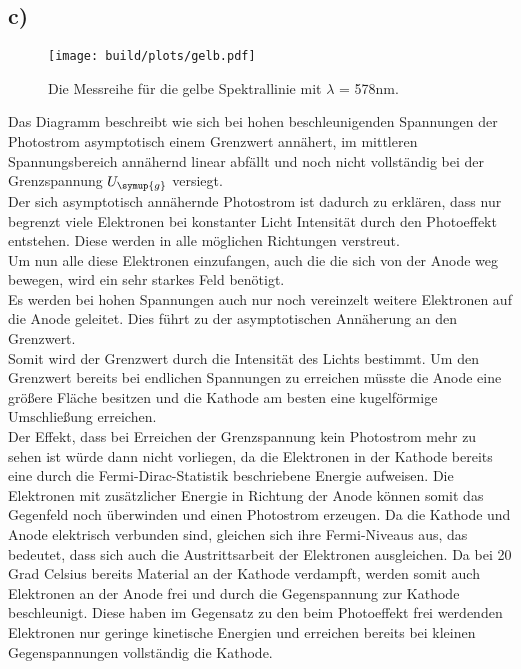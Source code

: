     \subsection{c)}

    \begin{figure}[H]
        \centering
        \texttt{[image: build/plots/gelb.pdf]}
        \caption{Die Messreihe für die gelbe Spektrallinie mit $\lambda$ = 578nm.}
        \label{img:gelb}
    \end{figure}

    \noindent
    Das Diagramm beschreibt wie sich bei hohen beschleunigenden Spannungen der Photostrom asymptotisch einem Grenzwert annähert, im mittleren 
    Spannungsbereich annähernd linear abfällt und noch nicht vollständig bei der Grenzspannung $U_{\symup{g}}$ versiegt.\\
    Der sich asymptotisch annähernde Photostrom ist dadurch zu erklären, dass nur begrenzt viele Elektronen bei konstanter Licht Intensität 
    durch den Photoeffekt entstehen. Diese werden in alle möglichen Richtungen verstreut.\\
    Um nun alle diese Elektronen einzufangen, auch die die sich  
    von der Anode weg bewegen, wird ein sehr starkes Feld benötigt.\\
    Es werden bei hohen Spannungen auch nur noch vereinzelt
    weitere Elektronen auf die Anode geleitet. Dies führt zu der asymptotischen Annäherung an den Grenzwert.\\
    Somit wird der Grenzwert durch die 
    Intensität des Lichts bestimmt. Um den Grenzwert bereits bei endlichen Spannungen zu erreichen müsste die Anode eine größere Fläche besitzen
    und die Kathode am besten eine kugelförmige Umschließung erreichen.\\
    Der Effekt, dass bei Erreichen der Grenzspannung kein Photostrom mehr zu sehen ist würde dann nicht vorliegen, da die Elektronen in der Kathode 
    bereits eine durch die Fermi-Dirac-Statistik beschriebene Energie aufweisen. Die Elektronen mit zusätzlicher Energie in Richtung der Anode 
    können somit das Gegenfeld noch überwinden und einen Photostrom erzeugen.
    Da die Kathode und Anode elektrisch verbunden sind, gleichen sich ihre Fermi-Niveaus aus, das bedeutet, dass sich auch die Austrittsarbeit 
    der Elektronen ausgleichen. Da bei 20 Grad Celsius bereits Material an der Kathode verdampft, werden somit auch Elektronen an der Anode frei 
    und durch die Gegenspannung zur Kathode beschleunigt.
    Diese haben im Gegensatz zu den beim Photoeffekt frei werdenden Elektronen nur geringe kinetische Energien und erreichen bereits bei kleinen 
    Gegenspannungen vollständig die Kathode.
    

